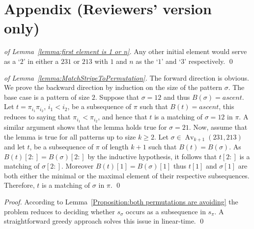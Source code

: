 \documentclass[a4paper]{llncs}
\DeclareMathOperator{\Avd}{Av}
\newcommand\Av[2]{\Avd_{{#1}}({#2})}
\newcommand{\bijection}{B}
\begin{document}
{}




\newpage
\section*{Appendix (Reviewers' version only)}

\begin{proof}[of Lemma~\ref{lemma:first element is 1 or n}]
Any other initial element would serve as a `$2$' in either a
$231$ or $213$ with $1$ and $n$ as the `$1$' and `$3$' respectively.
\qed
\end{proof}

\bigskip

\begin{proof}[of Lemma~\ref{lemma:MatchStripeToPermutation}]
  The forward direction is obvious.
  We prove the backward direction by induction on the size of the pattern
  $\sigma$.
  The base case is a pattern of size $2$.
  Suppose that $\sigma = 12$ and thus $\bijection(\sigma) = ascent$.
  Let $t = \pi_{i_1}\pi_{i_2}$, $i_1 < i_2$, be a subsequence of $\pi$
  such that $\bijection(t) = ascent$, this reduces to saying that
  $\pi_{i_1} < \pi_{i_2}$, 
  and hence that $t$ is a matching of $\sigma = 12$ in $\pi$.
  A similar argument shows that the lemma holds true for $\sigma = 21$.
  Now, assume that the lemma is true for all patterns up to size $k \geq 2$.
  Let $\sigma \in \Av{k+1}{231,213}$ and
  let $t$,
  be a subsequence of $\pi$ of length $k+1$ such that
  $\bijection(t) = \bijection(\sigma)$.
  As $\bijection(t)[2:] = \bijection(\sigma)[2:]$
  by the inductive hypothesis, it follows that
  $t[2:]$ is a matching of $\sigma[2:]$.
  Moreover $\bijection(t)[1] = \bijection(\sigma)[1]$ 
  thus $t[1]$ and $\sigma[1]$ are both either the minimal or the maximal
  element of their respective subsequences.
  Therefore, $t$ is a matching of $\sigma$ in $\pi$.
  \qed
\end{proof}

\bigskip

\begin{proof}
According to Lemma~\ref{Proposition:both permutations are avoiding} the problem reduces
to deciding whether $s_\sigma$ occurs as a subsequence in $s_\pi$.
A straightforward greedy approach solves this issue in linear-time.
\qed
\end{proof}

\bigskip
\end{document}
